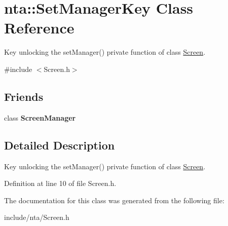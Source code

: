 \hypertarget{classnta_1_1SetManagerKey}{}\section{nta\+:\+:Set\+Manager\+Key Class Reference}
\label{classnta_1_1SetManagerKey}


Key unlocking the set\+Manager() private function of class \hyperlink{classnta_1_1Screen}{Screen}.  




{\ttfamily \#include $<$Screen.\+h$>$}

\subsection*{Friends}
\begin{DoxyCompactItemize}
\item 
\mbox{\label{classnta_1_1SetManagerKey_a888edc649fed896d28811ec69f3f2066}} 
class {\bfseries Screen\+Manager}
\end{DoxyCompactItemize}


\subsection{Detailed Description}
Key unlocking the set\+Manager() private function of class \hyperlink{classnta_1_1Screen}{Screen}. 

Definition at line 10 of file Screen.\+h.



The documentation for this class was generated from the following file\+:\begin{DoxyCompactItemize}
\item 
include/nta/Screen.\+h\end{DoxyCompactItemize}
